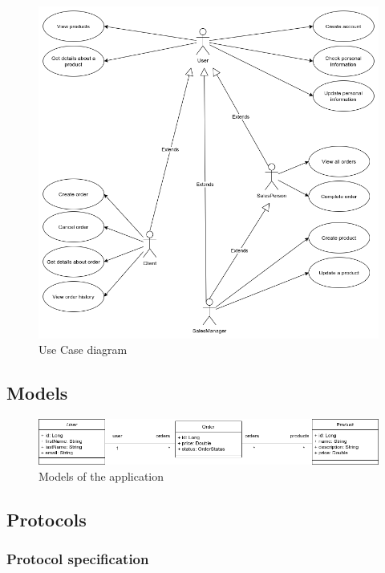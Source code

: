 \documentclass{article}
\begin{document}
\begin{figure}[H]
    \centering
    \includegraphics[width=\linewidth]{img/usecases.png}
    \caption{Use Case diagram}
\end{figure}
    
\subsection {Models}
    
\begin{figure}[H]
    \centering
    \includegraphics[width=\linewidth]{img/Models.png}
    \caption{Models of the application}
\end{figure}


\subsection{Protocols}

\subsubsection{Protocol specification}
\end{document}
